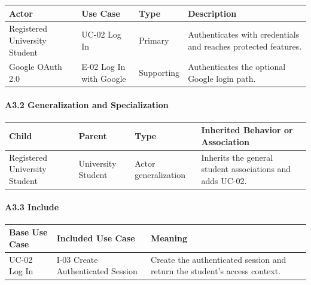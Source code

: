 \documentclass[12pt]{article}
\renewcommand{\baselinestretch}{1.5}
\begin{document}
\begingroup
\small
\renewcommand{\baselinestretch}{1.0}\selectfont
\renewcommand{\arraystretch}{1.15}
\setlength{\tabcolsep}{6pt}
\begin{longtable}{|>{\raggedright\arraybackslash}p{}|>{\raggedright\arraybackslash}p{}|>{\raggedright\arraybackslash}p{}|>{\raggedright\arraybackslash}p{}|}
\hline
\textbf{Actor} & \textbf{Use Case} & \textbf{Type} & \textbf{Description} \\ \hline
\endhead
Registered University Student & UC-02 Log In & Primary & Authenticates with credentials and reaches protected features. \\ \hline
Google OAuth 2.0 & E-02 Log In with Google & Supporting & Authenticates the optional Google login path. \\ \hline
\end{longtable}
\endgroup
\par\medskip

\hypertarget{sec:a3-2-generalization-and-specialization}{}
\paragraph*{A3.2 Generalization and Specialization}
\par\medskip

\begingroup
\small
\renewcommand{\baselinestretch}{1.0}\selectfont
\renewcommand{\arraystretch}{1.15}
\setlength{\tabcolsep}{6pt}
\begin{longtable}{|>{\raggedright\arraybackslash}p{}|>{\raggedright\arraybackslash}p{}|>{\raggedright\arraybackslash}p{}|>{\raggedright\arraybackslash}p{}|}
\hline
\textbf{Child} & \textbf{Parent} & \textbf{Type} & \textbf{Inherited Behavior or Association} \\ \hline
\endhead
Registered University Student & University Student & Actor generalization & Inherits the general student associations and adds UC-02. \\ \hline
\end{longtable}
\endgroup
\par\medskip

\hypertarget{sec:a3-3-include}{}
\paragraph*{A3.3 Include}
\par\medskip

\begingroup
\small
\renewcommand{\baselinestretch}{1.0}\selectfont
\renewcommand{\arraystretch}{1.15}
\setlength{\tabcolsep}{6pt}
\begin{longtable}{|>{\raggedright\arraybackslash}p{}|>{\raggedright\arraybackslash}p{}|>{\raggedright\arraybackslash}p{}|}
\hline
\textbf{Base Use Case} & \textbf{Included Use Case} & \textbf{Meaning} \\ \hline
\endhead
UC-02 Log In & I-03 Create Authenticated Session & Create the authenticated session and return the student's access context. \\ \hline
\end{longtable}
\endgroup
\par\medskip
\end{document}
